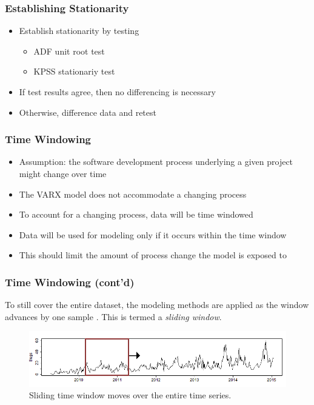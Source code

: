 \documentclass[presentation]{beamer}
\begin{document}
\begin{frame}[t]
\frametitle{Establishing Stationarity}
\begin{itemize}
\item{Establish stationarity by testing
  \begin{itemize}
  \item{ADF unit root test}
  \item{KPSS stationariy test}
  \end{itemize}}
\item{If test results agree, then no differencing is necessary}
\item{Otherwise, difference data and retest}
\end{itemize}
\end{frame}

\begin{frame}[t]
\frametitle{Time Windowing}
\begin{itemize}
\item{Assumption: the software development process underlying a given project might change over time}
\item{The VARX model does not accommodate a changing process}
\item{To account for a changing process, data will be time windowed}
\item{Data will be used for modeling only if it occurs within the time window}
\item{This should limit the amount of process change the model is exposed to}
\end{itemize}
\end{frame}

\begin{frame}[t]
\frametitle{Time Windowing (cont'd)}
To still cover the entire dataset, the modeling methods are applied as the window advances by one sample . This is termed a \textit{sliding window}.
\begin{figure}[htbp]
\begin{center}
\includegraphics[width=\textwidth]{assets/time_series_sliding_window.png}
\caption{Sliding time window moves over the entire time series.}
\end{center}
\end{figure}
\end{frame}
\end{document}
